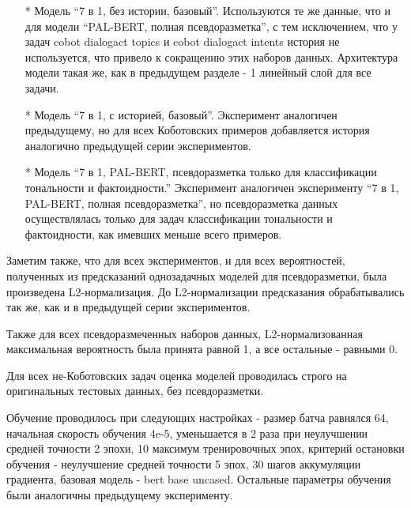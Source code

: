 \begin{itemize}
\item[*] Модель “7 в 1, без истории, базовый”. Используются те же данные, что и для модели “PAL-BERT, полная псевдоразметка”, с тем исключением, что у задач cobot dialogact topics и cobot dialogact intents история не используется, что привело к сокращению этих наборов данных. Архитектура модели такая же, как в предыдущем разделе - 1 линейный слой для все задачи.

\item[*] Модель “7 в 1, с историей, базовый”. Эксперимент аналогичен предыдущему, но для всех Коботовских примеров добавляется история аналогично предыдущей серии экспериментов.

\item[*] Модель “7 в 1, PAL-BERT, псевдоразметка только для классификации тональности и фактоидности.” Эксперимент аналогичен эксперименту “7 в 1, PAL-BERT, полная псевдоразметка”, но псевдоразметка данных осуществлялась только для задач классификации тональности и фактоидности, как имевших меньше всего примеров.

\end{itemize}
Заметим также, что для всех экспериментов, и для всех вероятностей, полученных из предсказаний однозадачных моделей для псевдоразметки, была произведена L2-нормализация. До L2-нормализации предсказания обрабатывались так же, как и в предыдущей серии экспериментов.

Также для всех псевдоразмеченных наборов данных, L2-нормализованная максимальная вероятность была принята равной 1, а все остальные - равными 0.

Для всех не-Коботовских задач оценка моделей проводилась строго на оригинальных тестовых данных, без псевдоразметки.

Обучение проводилось при следующих настройках - размер батча равнялся 64, начальная скорость обучения 4e-5, уменьшается в 2 раза при неулучшении средней точности 2 эпохи, 10 максимум тренировочных эпох, критерий остановки обучения - неулучшение средней точности 5 эпох, 30 шагов аккумуляции градиента, базовая модель - bert base uncased. Остальные параметры обучения были аналогичны предыдущему эксперименту.

